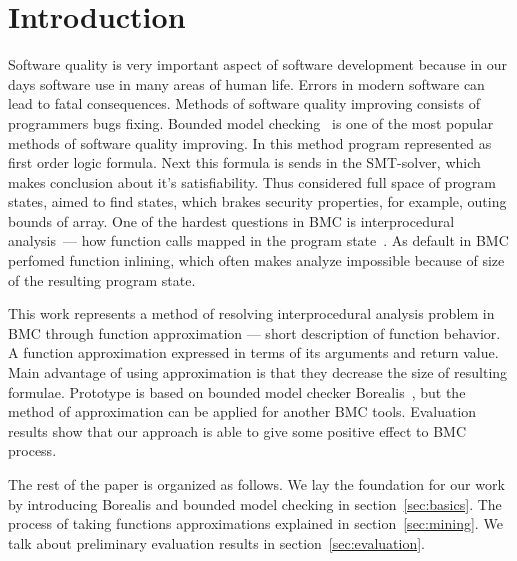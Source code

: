 \section{Introduction}
Software quality is very important aspect of software development because in our days software use in many areas of human life. Errors in modern software can lead to fatal consequences. Methods of software quality improving consists of programmers bugs fixing. Bounded model checking~\cite{biere2003bounded} is one of the most popular methods of software quality improving. In this method program represented as first order logic formula. Next this formula is sends in the SMT-solver, which makes conclusion about it's satisfiability. Thus considered full space of program states, aimed to find states, which brakes security properties, for example, outing bounds of array. One of the hardest questions in BMC is interprocedural analysis~--- how function calls mapped in the program state~\cite{InterprocIsHard}. As default in BMC perfomed function inlining, which often makes analyze impossible because of size of the resulting program state.

This work represents a method of resolving interprocedural analysis problem in BMC through function approximation --- short description of function behavior. A function approximation expressed in terms of its arguments and return value. Main advantage of using approximation is that they decrease the size of resulting formulae. Prototype is based on bounded model checker Borealis~\cite{Borealis}, but the method of approximation can be applied for another BMC tools. Evaluation results show that our approach is able to give some positive effect to BMC process.

The rest of the paper is organized as follows. We lay the foundation for our work by introducing Borealis and bounded model checking in section~\ref{sec:basics}. The process of taking functions approximations explained in section~\ref{sec:mining}. We talk about preliminary evaluation results in section~\ref{sec:evaluation}.
